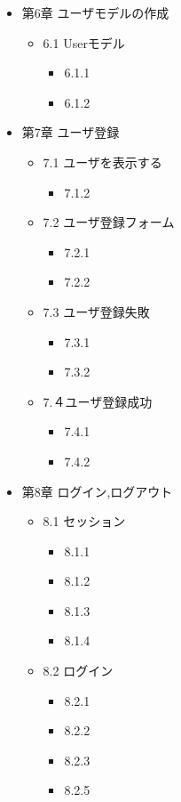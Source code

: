 \begin{itemize}
    \item 第6章 ユーザモデルの作成
    \begin{itemize}
        \item 6.1 Userモデル
        \begin{itemize}
            \item 6.1.1
            \item 6.1.2
        \end{itemize}
    \end{itemize}

    \item 第7章 ユーザ登録
    \begin{itemize}
        \item 7.1 ユーザを表示する
        \begin{itemize}
            \item 7.1.2
        \end{itemize}
        \item 7.2 ユーザ登録フォーム
        \begin{itemize}
            \item 7.2.1
            \item 7.2.2
        \end{itemize}
        \item 7.3 ユーザ登録失敗
        \begin{itemize}
            \item 7.3.1
            \item 7.3.2
        \end{itemize}
        \item 7.４ユーザ登録成功
        \begin{itemize}
            \item 7.4.1
            \item 7.4.2
        \end{itemize}
    \end{itemize}

    \item 第8章 ログイン,ログアウト
    \begin{itemize}
        \item 8.1 セッション
        \begin{itemize}
            \item 8.1.1
            \item 8.1.2
            \item 8.1.3
            \item 8.1.4
        \end{itemize}
        \item 8.2 ログイン
        \begin{itemize}
            \item 8.2.1
            \item 8.2.2
            \item 8.2.3
            \item 8.2.5
        \end{itemize}
    \end{itemize}


\end{itemize}
